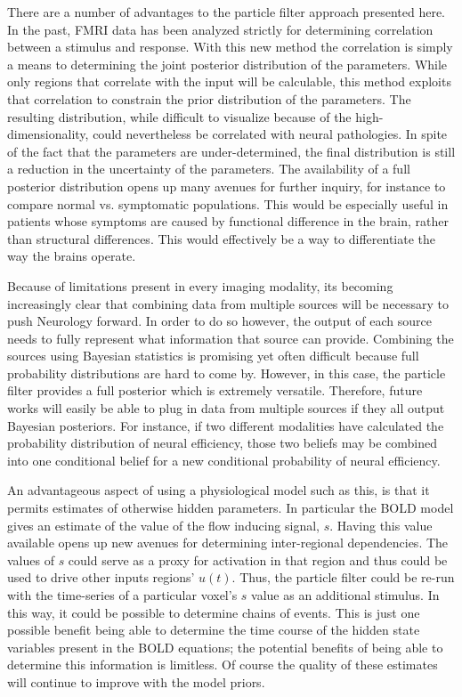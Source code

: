 \documentclass[journal]{./IEEEtran}
\begin{document}
There are a number of advantages to the particle filter approach presented
here. In the past, FMRI data has been analyzed strictly for determining
correlation between a stimulus and response. With this new method
the correlation is simply a means to determining the joint posterior distribution
of the parameters. While only regions that correlate with the input will
be calculable, this method exploits that correlation to constrain the
prior distribution of the parameters. The resulting distribution, while difficult
to visualize because of the high-dimensionality, could nevertheless be
correlated with neural pathologies. In spite of the fact that the parameters
are under-determined, the final distribution is still a reduction in the
uncertainty of the parameters. The availability of a full posterior distribution
opens up many avenues for further inquiry, for instance
to compare normal vs. symptomatic
populations. This would be especially useful in patients whose symptoms
are caused by functional difference in the brain, rather than structural differences.
This would effectively be
a way to differentiate the way the brains operate.

Because of limitations present in every imaging modality,
its becoming increasingly clear that combining data from multiple sources
will be necessary to push Neurology forward. In order to do so however, the
output of each source needs to fully represent what information that source
can provide. Combining the sources using Bayesian statistics is promising
yet often difficult because full probability distributions are hard to come by.
However, in this case, the particle filter provides a full posterior which
is extremely versatile. Therefore, future works will easily be able to
plug in data from multiple sources if they all output Bayesian posteriors.
For instance, if two different modalities have calculated the probability
distribution of neural efficiency, those two beliefs may be combined into
one conditional belief for a new conditional probability of neural efficiency.

An advantageous aspect of using a physiological model such as this, is that
it permits estimates of otherwise hidden parameters. In particular the BOLD
model gives an estimate of the value of the flow inducing signal, $s$. Having
this value available opens up new avenues for determining inter-regional
dependencies. The values of $s$ could serve as a proxy for activation in
that region and thus could be used to drive other inputs regions' $u(t)$.
Thus, the particle filter could be re-run
with the time-series of a particular voxel's $s$ value as an additional stimulus.
In this way, it could be possible to determine chains of events. This is just
one possible benefit being able to determine the time course of the hidden
state variables present in the BOLD equations; the potential benefits of being
able to determine this information is limitless. Of course the quality of these
estimates will continue to improve with the model priors.
\end{document}
